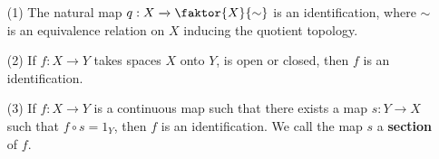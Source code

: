 \begin{example}\label{2.3}
    \begin{enumerate}
        \item[(1)] The natural map $q:X \xrightarrow{} \faktor{X}{\sim}$ is an
            identification, where $\sim$ is an equivalence relation on $X$
            inducing the quotient topology.

        \item[(2)] If $f:X \xrightarrow{} Y$ takes spaces $X$ onto $Y$, is open
            or closed, then  $f$ is an identification.

        \item[(3)] If $f:X \xrightarrow{} Y$ is a continuous map such that there
            exists a map $s:Y \xrightarrow{} X$ such that $f \circ s=1_Y$, then
             $f$ is an identification. We call the map  $s$ a  \textbf{section}
             of $f$.
    \end{enumerate}
\end{example}

